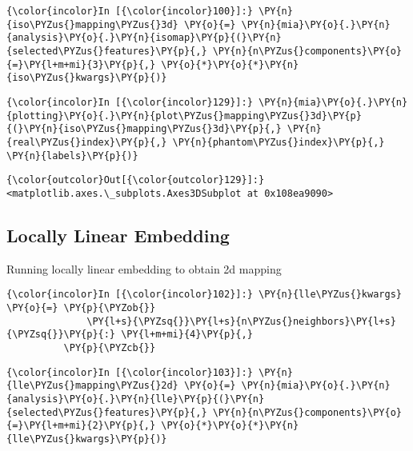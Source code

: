     \begin{Verbatim}[commandchars=\\\{\}]
{\color{incolor}In [{\color{incolor}100}]:} \PY{n}{iso\PYZus{}mapping\PYZus{}3d} \PY{o}{=} \PY{n}{mia}\PY{o}{.}\PY{n}{analysis}\PY{o}{.}\PY{n}{isomap}\PY{p}{(}\PY{n}{selected\PYZus{}features}\PY{p}{,} \PY{n}{n\PYZus{}components}\PY{o}{=}\PY{l+m+mi}{3}\PY{p}{,} \PY{o}{*}\PY{o}{*}\PY{n}{iso\PYZus{}kwargs}\PY{p}{)}
\end{Verbatim}

    \begin{Verbatim}[commandchars=\\\{\}]
{\color{incolor}In [{\color{incolor}129}]:} \PY{n}{mia}\PY{o}{.}\PY{n}{plotting}\PY{o}{.}\PY{n}{plot\PYZus{}mapping\PYZus{}3d}\PY{p}{(}\PY{n}{iso\PYZus{}mapping\PYZus{}3d}\PY{p}{,} \PY{n}{real\PYZus{}index}\PY{p}{,} \PY{n}{phantom\PYZus{}index}\PY{p}{,} \PY{n}{labels}\PY{p}{)}
\end{Verbatim}

            \begin{Verbatim}[commandchars=\\\{\}]
{\color{outcolor}Out[{\color{outcolor}129}]:} <matplotlib.axes.\_subplots.Axes3DSubplot at 0x108ea9090>
\end{Verbatim}

    \subsection{Locally Linear Embedding}\label{locally-linear-embedding}

Running locally linear embedding to obtain 2d mapping

    \begin{Verbatim}[commandchars=\\\{\}]
{\color{incolor}In [{\color{incolor}102}]:} \PY{n}{lle\PYZus{}kwargs} \PY{o}{=} \PY{p}{\PYZob{}}
              \PY{l+s}{\PYZsq{}}\PY{l+s}{n\PYZus{}neighbors}\PY{l+s}{\PYZsq{}}\PY{p}{:} \PY{l+m+mi}{4}\PY{p}{,}
          \PY{p}{\PYZcb{}}
\end{Verbatim}

    \begin{Verbatim}[commandchars=\\\{\}]
{\color{incolor}In [{\color{incolor}103}]:} \PY{n}{lle\PYZus{}mapping\PYZus{}2d} \PY{o}{=} \PY{n}{mia}\PY{o}{.}\PY{n}{analysis}\PY{o}{.}\PY{n}{lle}\PY{p}{(}\PY{n}{selected\PYZus{}features}\PY{p}{,} \PY{n}{n\PYZus{}components}\PY{o}{=}\PY{l+m+mi}{2}\PY{p}{,} \PY{o}{*}\PY{o}{*}\PY{n}{lle\PYZus{}kwargs}\PY{p}{)}
\end{Verbatim}


